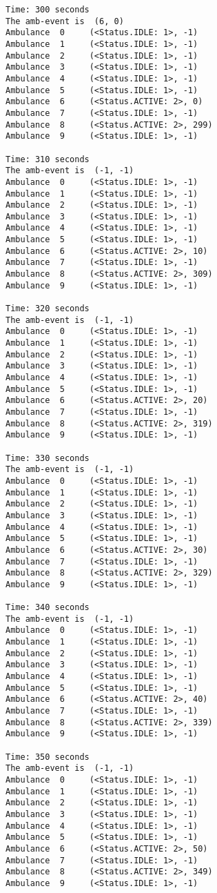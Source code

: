\documentclass[11pt]{article}
\begin{document}
\begin{Verbatim}[commandchars=\\\{\}]
Time: 300 seconds
The amb-event is  (6, 0)
Ambulance  0	 (<Status.IDLE: 1>, -1)
Ambulance  1	 (<Status.IDLE: 1>, -1)
Ambulance  2	 (<Status.IDLE: 1>, -1)
Ambulance  3	 (<Status.IDLE: 1>, -1)
Ambulance  4	 (<Status.IDLE: 1>, -1)
Ambulance  5	 (<Status.IDLE: 1>, -1)
Ambulance  6	 (<Status.ACTIVE: 2>, 0)
Ambulance  7	 (<Status.IDLE: 1>, -1)
Ambulance  8	 (<Status.ACTIVE: 2>, 299)
Ambulance  9	 (<Status.IDLE: 1>, -1)

Time: 310 seconds
The amb-event is  (-1, -1)
Ambulance  0	 (<Status.IDLE: 1>, -1)
Ambulance  1	 (<Status.IDLE: 1>, -1)
Ambulance  2	 (<Status.IDLE: 1>, -1)
Ambulance  3	 (<Status.IDLE: 1>, -1)
Ambulance  4	 (<Status.IDLE: 1>, -1)
Ambulance  5	 (<Status.IDLE: 1>, -1)
Ambulance  6	 (<Status.ACTIVE: 2>, 10)
Ambulance  7	 (<Status.IDLE: 1>, -1)
Ambulance  8	 (<Status.ACTIVE: 2>, 309)
Ambulance  9	 (<Status.IDLE: 1>, -1)

Time: 320 seconds
The amb-event is  (-1, -1)
Ambulance  0	 (<Status.IDLE: 1>, -1)
Ambulance  1	 (<Status.IDLE: 1>, -1)
Ambulance  2	 (<Status.IDLE: 1>, -1)
Ambulance  3	 (<Status.IDLE: 1>, -1)
Ambulance  4	 (<Status.IDLE: 1>, -1)
Ambulance  5	 (<Status.IDLE: 1>, -1)
Ambulance  6	 (<Status.ACTIVE: 2>, 20)
Ambulance  7	 (<Status.IDLE: 1>, -1)
Ambulance  8	 (<Status.ACTIVE: 2>, 319)
Ambulance  9	 (<Status.IDLE: 1>, -1)

Time: 330 seconds
The amb-event is  (-1, -1)
Ambulance  0	 (<Status.IDLE: 1>, -1)
Ambulance  1	 (<Status.IDLE: 1>, -1)
Ambulance  2	 (<Status.IDLE: 1>, -1)
Ambulance  3	 (<Status.IDLE: 1>, -1)
Ambulance  4	 (<Status.IDLE: 1>, -1)
Ambulance  5	 (<Status.IDLE: 1>, -1)
Ambulance  6	 (<Status.ACTIVE: 2>, 30)
Ambulance  7	 (<Status.IDLE: 1>, -1)
Ambulance  8	 (<Status.ACTIVE: 2>, 329)
Ambulance  9	 (<Status.IDLE: 1>, -1)

Time: 340 seconds
The amb-event is  (-1, -1)
Ambulance  0	 (<Status.IDLE: 1>, -1)
Ambulance  1	 (<Status.IDLE: 1>, -1)
Ambulance  2	 (<Status.IDLE: 1>, -1)
Ambulance  3	 (<Status.IDLE: 1>, -1)
Ambulance  4	 (<Status.IDLE: 1>, -1)
Ambulance  5	 (<Status.IDLE: 1>, -1)
Ambulance  6	 (<Status.ACTIVE: 2>, 40)
Ambulance  7	 (<Status.IDLE: 1>, -1)
Ambulance  8	 (<Status.ACTIVE: 2>, 339)
Ambulance  9	 (<Status.IDLE: 1>, -1)

Time: 350 seconds
The amb-event is  (-1, -1)
Ambulance  0	 (<Status.IDLE: 1>, -1)
Ambulance  1	 (<Status.IDLE: 1>, -1)
Ambulance  2	 (<Status.IDLE: 1>, -1)
Ambulance  3	 (<Status.IDLE: 1>, -1)
Ambulance  4	 (<Status.IDLE: 1>, -1)
Ambulance  5	 (<Status.IDLE: 1>, -1)
Ambulance  6	 (<Status.ACTIVE: 2>, 50)
Ambulance  7	 (<Status.IDLE: 1>, -1)
Ambulance  8	 (<Status.ACTIVE: 2>, 349)
Ambulance  9	 (<Status.IDLE: 1>, -1)


\end{Verbatim}
\end{document}
